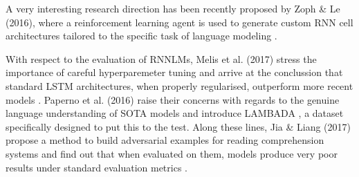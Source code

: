 A very interesting research direction has been recently proposed by Zoph \& Le (2016), where a reinforcement learning agent is used to generate custom
RNN cell architectures tailored to the specific task of language modeling \cite{zoph2016neural}.

With respect to the evaluation of RNNLMs, Melis et al. (2017) stress the importance of careful hyperparemeter tuning and arrive at the conclussion that standard LSTM architectures, when properly regularised, outperform more recent models \cite{melis2017state}. Paperno et al. (2016) raise their concerns with regards to the genuine language understanding of SOTA models and introduce LAMBADA \cite{paperno2016lambada}, a dataset specifically designed to put this to the test. Along these lines, Jia \& Liang (2017) propose a method to build adversarial examples for reading comprehension systems and find out that when evaluated on them, models produce very poor results under standard evaluation metrics \cite{jia2017adversarial}.